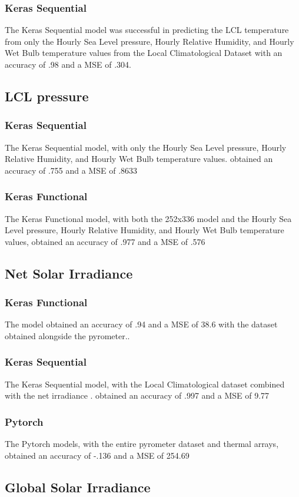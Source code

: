 \documentclass[conference]{IEEEtran}
\begin{document}
\subsubsection{Keras Sequential}
The Keras Sequential model was successful in predicting the LCL temperature from only the Hourly Sea Level pressure, Hourly Relative Humidity, and Hourly Wet Bulb temperature values from the 
Local Climatological Dataset with an accuracy of .98 and a MSE of .304.
\subsection{LCL pressure}
\subsubsection{Keras Sequential}
The Keras Sequential model, with only the Hourly Sea Level pressure, Hourly Relative Humidity, and Hourly Wet Bulb temperature values. obtained an accuracy of .755 and a MSE of .8633
\subsubsection{Keras Functional}
The Keras Functional model, with both the 252x336 model and the Hourly Sea Level pressure, Hourly Relative Humidity, and Hourly Wet Bulb temperature values, obtained an accuracy of .977 and a MSE of .576
\subsection{Net Solar Irradiance}
\subsubsection{Keras Functional}
The model obtained an accuracy of .94 and a MSE of 38.6 with the dataset obtained alongside the pyrometer..
\subsubsection{Keras Sequential}
The Keras Sequential model, with the Local Climatological dataset combined with the net irradiance . obtained an accuracy of .997 and a MSE of 9.77
\subsubsection{Pytorch}
The Pytorch models, with the entire pyrometer dataset and thermal arrays, obtained an accuracy of -.136 and a MSE of 254.69
\subsection{Global Solar Irradiance}
\end{document}
